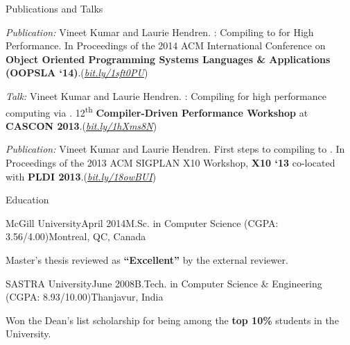 \documentclass{resume} %
\begin{document}

\begin{rSection}{Publications and Talks}
\smallskip
\begin{lSubsection}


\item \emph{Publication:} Vineet Kumar and Laurie Hendren. \mixten:
Compiling \matlab to \xten for High Performance. In Proceedings of the 2014
ACM International Conference on \textbf{Object Oriented Programming Systems
Languages \& Applications (OOPSLA `14)}.(\href{http://bit.ly/1sft0PU}{\em{bit.ly/1sft0PU}})

\item \emph{Talk:} Vineet Kumar and Laurie Hendren. \mixten: Compiling \matlab
for high performance computing via \xten. 12\textsuperscript{th}
\textbf{Compiler-Driven Performance Workshop} at \textbf{CASCON
2013}.(\href{http://webdocs.cs.ualberta.ca/~amaral/cascon/CDP13/#VinetKumar}{\em{bit.ly/1hXms8N}}) 

\item \emph{Publication:} Vineet Kumar and Laurie Hendren. First steps to
compiling \matlab to \xten. In Proceedings of the 2013 ACM SIGPLAN X10
Workshop, \textbf{X10 `13} co-located with \textbf{PLDI
2013}.(\href{http://www.sable.mcgill.ca/mclab/mix10/paper.pdf}{\em{bit.ly/18owBUI}})
\end{lSubsection}
\end{rSection}

 
\begin{rSection}{Education}

\begin{rSubsection}{McGill University}{April 2014}{M.Sc. in
Computer Science (CGPA: 3.56/4.00)}{Montreal, QC, Canada} 
\item Master's thesis reviewed as \textbf{``Excellent''} by the external
reviewer.
\end{rSubsection}

\begin{rSubsection}{SASTRA University}{June 2008}{B.Tech. in Computer Science
\& Engineering (CGPA: 8.93/10.00)}{Thanjavur, India} 
\item Won the {Dean's list scholarship} for being among the \textbf{top
10\%} students in the University. 
\end{rSubsection}

\end{rSection}
\end{document}
